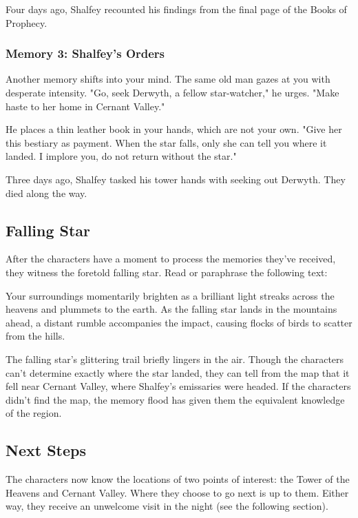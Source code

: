 \documentclass[10pt,a4paper,twoside,bg=print,twocolumn,openany,nodeprecatedcode]{dndbook}
\begin{document}
Four days ago, Shalfey recounted his findings from the final page of the Books of Prophecy.

\subsubsection{Memory 3: Shalfey's Orders}
\begin{DndReadAloud}{}
Another memory shifts into your mind. The same old man gazes at you with desperate intensity. "Go, seek Derwyth, a fellow star-watcher," he urges. "Make haste to her home in Cernant Valley."

He places a thin leather book in your hands, which are not your own. "Give her this bestiary as payment. When the star falls, only she can tell you where it landed. I implore you, do not return without the star."

\end{DndReadAloud}

Three days ago, Shalfey tasked his tower hands with seeking out Derwyth. They died along the way.

\subsection{Falling Star}
After the characters have a moment to process the memories they've received, they witness the foretold falling star. Read or paraphrase the following text:

\begin{DndReadAloud}{}
Your surroundings momentarily brighten as a brilliant light streaks across the heavens and plummets to the earth. As the falling star lands in the mountains ahead, a distant rumble accompanies the impact, causing flocks of birds to scatter from the hills.

\end{DndReadAloud}

The falling star's glittering trail briefly lingers in the air. Though the characters can't determine exactly where the star landed, they can tell from the map that it fell near Cernant Valley, where Shalfey's emissaries were headed. If the characters didn't find the map, the memory flood has given them the equivalent knowledge of the region.

\subsection{Next Steps}
The characters now know the locations of two points of interest: the Tower of the Heavens and Cernant Valley. Where they choose to go next is up to them. Either way, they receive an unwelcome visit in the night (see the following section).
\end{document}

